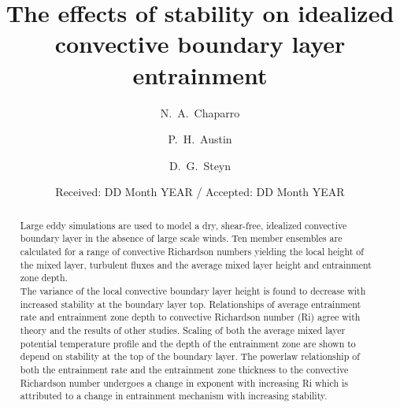 \documentclass[referee]{svjour3}
\begin{document}
\graphicspath{{./figures/}}


\title{The effects of stability on idealized convective boundary layer entrainment%
}


\author{N.~A.~Chaparro \and P.~H.~Austin \and D.~G.~Steyn
}



\date{Received: DD Month YEAR / Accepted: DD Month YEAR}


\maketitle

\begin{abstract}

Large eddy simulations are used to  model a dry, shear-free, idealized convective boundary layer in the absence of large scale winds.  Ten member ensembles are calculated for a range of convective  Richardson numbers yielding the local height of the mixed layer, turbulent fluxes  and the average mixed layer height and entrainment zone depth. \\

The variance of the local convective boundary layer height is found to decrease with increased stability at the boundary layer top.  Relationships of average entrainment rate and entrainment zone depth to convective Richardson number (Ri) agree with theory and the results of other studies.  Scaling of both the average mixed layer potential temperature profile and the depth of the entrainment zone are shown to depend on stability at the top of the boundary layer.   The  powerlaw relationship of both the entrainment rate and the entrainment zone thickness to the convective Richardson number undergoes  a change in exponent with increasing Ri which is attributed to a change in entrainment mechanism with increasing stability.

\end{abstract}
\end{document}

